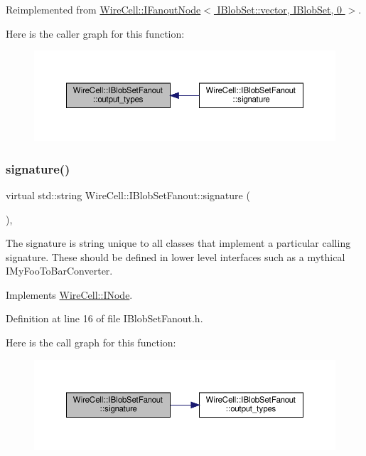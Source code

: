 Reimplemented from \hyperlink{class_wire_cell_1_1_i_fanout_node_a2191dc9d44b35d6ff4bda5d5356c6ac5}{Wire\+Cell\+::\+I\+Fanout\+Node$<$ I\+Blob\+Set\+::vector, I\+Blob\+Set, 0 $>$}.

Here is the caller graph for this function\+:
\nopagebreak
\begin{figure}[H]
\begin{center}
\leavevmode
\includegraphics[width=350pt]{class_wire_cell_1_1_i_blob_set_fanout_ad70f90237cc742ff5bdac87c661ed644_icgraph}
\end{center}
\end{figure}
\mbox{\label{class_wire_cell_1_1_i_blob_set_fanout_aa5b7abf68906984b11c7f6fe4bc1cf26}} 
\subsubsection{\texorpdfstring{signature()}{signature()}}
{\footnotesize\ttfamily virtual std\+::string Wire\+Cell\+::\+I\+Blob\+Set\+Fanout\+::signature (\begin{DoxyParamCaption}{ }\end{DoxyParamCaption})\hspace{0.3cm}{\ttfamily [inline]}, {\ttfamily [virtual]}}

The signature is string unique to all classes that implement a particular calling signature. These should be defined in lower level interfaces such as a mythical I\+My\+Foo\+To\+Bar\+Converter. 

Implements \hyperlink{class_wire_cell_1_1_i_node_a0b0763465adf5ba7febe8e378162b584}{Wire\+Cell\+::\+I\+Node}.



Definition at line 16 of file I\+Blob\+Set\+Fanout.\+h.

Here is the call graph for this function\+:
\nopagebreak
\begin{figure}[H]
\begin{center}
\leavevmode
\includegraphics[width=350pt]{class_wire_cell_1_1_i_blob_set_fanout_aa5b7abf68906984b11c7f6fe4bc1cf26_cgraph}
\end{center}
\end{figure}


